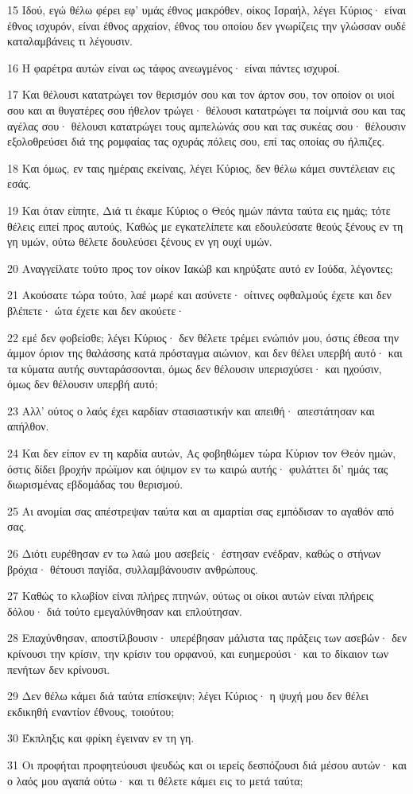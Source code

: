 \par 15 Ιδού, εγώ θέλω φέρει εφ' υμάς έθνος μακρόθεν, οίκος Ισραήλ, λέγει Κύριος· είναι έθνος ισχυρόν, είναι έθνος αρχαίον, έθνος του οποίου δεν γνωρίζεις την γλώσσαν ουδέ καταλαμβάνεις τι λέγουσιν.
\par 16 Η φαρέτρα αυτών είναι ως τάφος ανεωγμένος· είναι πάντες ισχυροί.
\par 17 Και θέλουσι κατατρώγει τον θερισμόν σου και τον άρτον σου, τον οποίον οι υιοί σου και αι θυγατέρες σου ήθελον τρώγει· θέλουσι κατατρώγει τα ποίμνιά σου και τας αγέλας σου· θέλουσι κατατρώγει τους αμπελώνάς σου και τας συκέας σου· θέλουσιν εξολοθρεύσει διά της ρομφαίας τας οχυράς πόλεις σου, επί τας οποίας συ ήλπιζες.
\par 18 Και όμως, εν ταις ημέραις εκείναις, λέγει Κύριος, δεν θέλω κάμει συντέλειαν εις εσάς.
\par 19 Και όταν είπητε, Διά τι έκαμε Κύριος ο Θεός ημών πάντα ταύτα εις ημάς; τότε θέλεις ειπεί προς αυτούς, Καθώς με εγκατελίπετε και εδουλεύσατε θεούς ξένους εν τη γη υμών, ούτω θέλετε δουλεύσει ξένους εν γη ουχί υμών.
\par 20 Αναγγείλατε τούτο προς τον οίκον Ιακώβ και κηρύξατε αυτό εν Ιούδα, λέγοντες;
\par 21 Ακούσατε τώρα τούτο, λαέ μωρέ και ασύνετε· οίτινες οφθαλμούς έχετε και δεν βλέπετε· ώτα έχετε και δεν ακούετε·
\par 22 εμέ δεν φοβείσθε; λέγει Κύριος· δεν θέλετε τρέμει ενώπιόν μου, όστις έθεσα την άμμον όριον της θαλάσσης κατά πρόσταγμα αιώνιον, και δεν θέλει υπερβή αυτό· και τα κύματα αυτής συνταράσσονται, όμως δεν θέλουσιν υπερισχύσει· και ηχούσιν, όμως δεν θέλουσιν υπερβή αυτό;
\par 23 Αλλ' ούτος ο λαός έχει καρδίαν στασιαστικήν και απειθή· απεστάτησαν και απήλθον.
\par 24 Και δεν είπον εν τη καρδία αυτών, Ας φοβηθώμεν τώρα Κύριον τον Θεόν ημών, όστις δίδει βροχήν πρώϊμον και όψιμον εν τω καιρώ αυτής· φυλάττει δι' ημάς τας διωρισμένας εβδομάδας του θερισμού.
\par 25 Αι ανομίαι σας απέστρεψαν ταύτα και αι αμαρτίαι σας εμπόδισαν το αγαθόν από σας.
\par 26 Διότι ευρέθησαν εν τω λαώ μου ασεβείς· έστησαν ενέδραν, καθώς ο στήνων βρόχια· θέτουσι παγίδα, συλλαμβάνουσιν ανθρώπους.
\par 27 Καθώς το κλωβίον είναι πλήρες πτηνών, ούτως οι οίκοι αυτών είναι πλήρεις δόλου· διά τούτο εμεγαλύνθησαν και επλούτησαν.
\par 28 Επαχύνθησαν, αποστίλβουσιν· υπερέβησαν μάλιστα τας πράξεις των ασεβών· δεν κρίνουσι την κρίσιν, την κρίσιν του ορφανού, και ευημερούσι· και το δίκαιον των πενήτων δεν κρίνουσι.
\par 29 Δεν θέλω κάμει διά ταύτα επίσκεψιν; λέγει Κύριος· η ψυχή μου δεν θέλει εκδικηθή εναντίον έθνους, τοιούτου;
\par 30 Έκπληξις και φρίκη έγειναν εν τη γη.
\par 31 Οι προφήται προφητεύουσι ψευδώς και οι ιερείς δεσπόζουσι διά μέσου αυτών· και ο λαός μου αγαπά ούτω· και τι θέλετε κάμει εις το μετά ταύτα;

